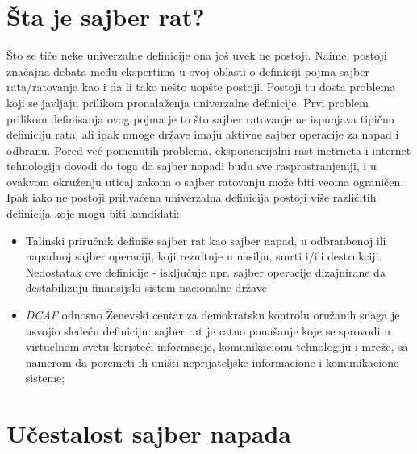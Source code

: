 \documentclass[a4paper]{article}
\begin{document}
{\section{Šta je sajber rat?}
Što se tiče neke univerzalne definicije ona još uvek ne postoji.
Naime, postoji značajna debata među ekspertima u ovoj oblasti o definiciji pojma sajber rata/ratovanja kao i da li tako nešto uopšte postoji. Postoji tu dosta problema koji se javljaju prilikom pronalaženja univerzalne definicije.
Prvi problem prilikom definisanja ovog pojma je to što sajber ratovanje ne ispunjava tipičnu definiciju rata, ali ipak mnoge države imaju aktivne sajber operacije za napad i odbranu. Pored već pomenutih problema, eksponencijalni rast inetrneta i internet tehnologija dovodi do toga da sajber napadi budu sve rasprostranjeniji, i u ovakvom okruženju uticaj zakona o sajber ratovanju može biti veoma ograničen.
Ipak iako ne postoji prihvaćena univerzalna definicija postoji više različitih definicija koje mogu biti kandidati:

\begin{itemize}
\item  Talinski priručnik definiše sajber rat kao sajber napad, u
odbranbenoj ili napadnoj sajber operaciji, koji rezultuje u
nasilju, smrti i/ili destrukciji. Nedostatak ove definicije -
isključuje npr. sajber operacije dizajnirane da destabilizuju
finansijski sistem nacionalne države
\item \emph{DCAF} odnosno Ženevski centar za demokratsku kontrolu oružanih snaga je usvojio sledeću definiciju: sajber rat je ratno ponašanje koje se sprovodi u virtuelnom svetu koristeći informacije, komunikacionu tehnologiju i mreže, sa namerom da poremeti ili uništi neprijateljske informacione i komunikacione sisteme;


\end{itemize} 




\section{Učestalost sajber napada}	
\label{sec:termini_i_citiranje}


}
\end{document}
